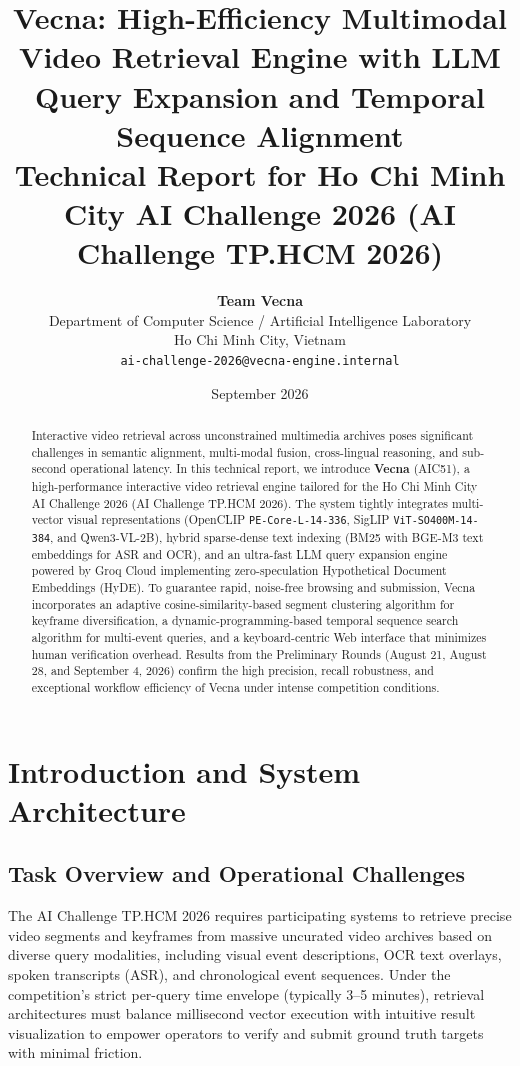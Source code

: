 \documentclass[10pt,a4paper,twocolumn]{article}
\title{\vspace{-0.5cm}\textbf{\Large Vecna: High-Efficiency Multimodal Video Retrieval Engine with LLM Query Expansion and Temporal Sequence Alignment}\\[0.2cm]
\large Technical Report for Ho Chi Minh City AI Challenge 2026 (AI Challenge TP.HCM 2026)}
\author{
\textbf{Team Vecna} \\
Department of Computer Science / Artificial Intelligence Laboratory \\
Ho Chi Minh City, Vietnam \\
\texttt{ai-challenge-2026@vecna-engine.internal}
}
\date{September 2026}
\begin{document}
\maketitle

\begin{abstract}
Interactive video retrieval across unconstrained multimedia archives poses significant challenges in semantic alignment, multi-modal fusion, cross-lingual reasoning, and sub-second operational latency. In this technical report, we introduce \textbf{Vecna} (AIC51), a high-performance interactive video retrieval engine tailored for the Ho Chi Minh City AI Challenge 2026 (AI Challenge TP.HCM 2026). The system tightly integrates multi-vector visual representations (OpenCLIP \texttt{PE-Core-L-14-336}, SigLIP \texttt{ViT-SO400M-14-384}, and Qwen3-VL-2B), hybrid sparse-dense text indexing (BM25 with BGE-M3 text embeddings for ASR and OCR), and an ultra-fast LLM query expansion engine powered by Groq Cloud implementing zero-speculation Hypothetical Document Embeddings (HyDE). To guarantee rapid, noise-free browsing and submission, Vecna incorporates an adaptive cosine-similarity-based segment clustering algorithm for keyframe diversification, a dynamic-programming-based temporal sequence search algorithm for multi-event queries, and a keyboard-centric Web interface that minimizes human verification overhead. Results from the Preliminary Rounds (August 21, August 28, and September 4, 2026) confirm the high precision, recall robustness, and exceptional workflow efficiency of Vecna under intense competition conditions.
\end{abstract}

\section{Introduction and System Architecture}

\subsection{Task Overview and Operational Challenges}
The AI Challenge TP.HCM 2026 requires participating systems to retrieve precise video segments and keyframes from massive uncurated video archives based on diverse query modalities, including visual event descriptions, OCR text overlays, spoken transcripts (ASR), and chronological event sequences. Under the competition's strict per-query time envelope (typically 3--5 minutes), retrieval architectures must balance millisecond vector execution with intuitive result visualization to empower operators to verify and submit ground truth targets with minimal friction.
\end{document}
